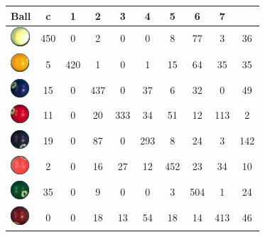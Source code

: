 \begin{table}[H]
\begin{center}
	\begin{tabular}{|l|c|c|c|c|c|c|c|c|c|}
		\hline
		Ball & c & \cellcolor{yellow}1 & \cellcolor{blue}2 & \cellcolor{red}3  & \cellcolor{purple}4 & \cellcolor{orange}5 & \cellcolor{green}6 & \cellcolor{brown}7 & \cellcolor{black}\textcolor{white}{8} \\
		\hline
		\includegraphics[]{images/ballsInVotes/0} & \cellcolor{gray}450 & 0 & 2 & 0 & 0 & 8 & 77 & 3 & 36\\
		\hline
		\includegraphics[]{images/ballsInVotes/1} & 5 & \cellcolor{gray}420 & 1 & 0 & 1 & 15 & 64 & 35 & 35\\
		\hline
		\includegraphics[]{images/ballsInVotes/2} & 15 & 0 & \cellcolor{gray}437 & 0 & 37 & 6 & 32 & 0 & 49\\
		\hline
		\includegraphics[]{images/ballsInVotes/3} & 11 & 0 & 20 & \cellcolor{gray}333 & 34 & 51 & 12 & 113 & 2\\
		\hline
		\includegraphics[]{images/ballsInVotes/4} & 19 & 0 & 87 & 0 & \cellcolor{gray}293 & 8 & 24 & 3 & 142\\
		\hline
		\includegraphics[]{images/ballsInVotes/5} & 2 & 0 & 16 & 27 & 12 & \cellcolor{gray}452 & 23 & 34 & 10\\
		\hline
		\includegraphics[]{images/ballsInVotes/6} & 35 & 0 & 9 & 0 & 0 & 3 & \cellcolor{gray}504 & 1 & 24\\
		\hline
		\includegraphics[]{images/ballsInVotes/7} & 0 & 0 & 18 & 13 & 54 & 18 & 14 & \cellcolor{gray}413 & 46\\

\end{tabular}
\end{center}
\end{table}

